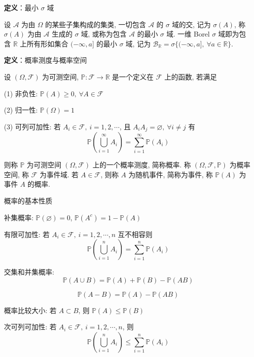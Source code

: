 \documentclass[openany]{ctexbook}
\theoremstyle{kaiti}
\theoremstyle{normal}
\begin{document}
\textbf{定义}：最小 $\sigma$ 域

设 $\mathcal{A}$ 为由 $\Omega$ 的某些子集构成的集类, 一切包含 $\mathcal{A}$ 的 $\sigma$ 域的交, 记为 $\sigma(A)$, 称 $\sigma(A)$ 为由 $\mathcal{A}$ 生成的 $\sigma$ 域, 或称为包含 $\mathcal{A}$ 的最小 $\sigma$ 域. 一维 Borel $\sigma$ 域即为包含 $\mathbb{R}$ 上所有形如集合 $(-\infty,a]$ 的最小 $\sigma$ 域, 记为 $\mathcal{B}_{\mathbb{R}}=\sigma\{(-\infty,a],~\forall a\in\mathbb{R}\}$.

\textbf{定义}：概率测度与概率空间

设 $(\Omega,\mathcal{F})$ 为可测空间, $\mathbb{P}:\mathcal{F}\to\mathbb{R}$ 是一个定义在 $\mathcal{F}$ 上的函数, 若满足

(1) 非负性: $\mathbb{P}(A)\geqslant0,~\forall A\in\mathcal{F}$

(2) 归一性: $\mathbb{P}(\Omega)=1$

(3) 可列可加性: 若 $A_i\in\mathcal{F},~i=1,2,\cdots$, 且 $A_iA_j=\varnothing,~\forall i\neq j$ 有
\begin{equation}
  \mathbb{P}\left(\bigcup_{i=1}^\infty A_i\right)=\sum_{i=1}^\infty \mathbb{P}(A_i)
\end{equation}
 
则称 $\mathbb{P}$ 为可测空间 $(\Omega,\mathcal{F})$ 上的一个概率测度, 简称概率. 称 $(\Omega,\mathcal{F},\mathbb{P})$ 为概率空间, 称 $\mathcal{F}$ 为事件域. 若 $A\in\mathcal{F}$, 则称 $A$ 为随机事件, 简称为事件, 称 $\mathbb{P}(A)$ 为事件 $A$ 的概率.

概率的基本性质

补集概率: $\mathbb{P}(\varnothing)=0$, $\mathbb{P}(A^c)=1-\mathbb{P}(A)$

有限可加性: 若 $A_i\in\mathcal{F},~i=1,2,\cdots,n$ 互不相容则
\begin{equation}
  \mathbb{P}\left(\bigcup_{i=1}^n A_i\right)=\sum_{i=1}^n \mathbb{P}(A_i)
\end{equation}

交集和并集概率:
\begin{equation}
  \mathbb{P}(A\cup B)=\mathbb{P}(A)+\mathbb{P}(B)-\mathbb{P}(AB)
\end{equation}

\begin{equation}
  \mathbb{P}(A-B)=\mathbb{P}(A)-\mathbb{P}(AB)
\end{equation}

概率比较大小: 若 $A\subset B$, 则 $\mathbb{P}(A)\leqslant \mathbb{P}(B)$

次可列可加性: 若 $A_i\in\mathcal{F},~i=1,2,\cdots,n$, 则
\begin{equation}
  \mathbb{P}\left(\bigcup_{i=1}^n A_i\right)\leqslant\sum_{i=1}^n \mathbb{P}(A_i)
\end{equation}
\end{document}
